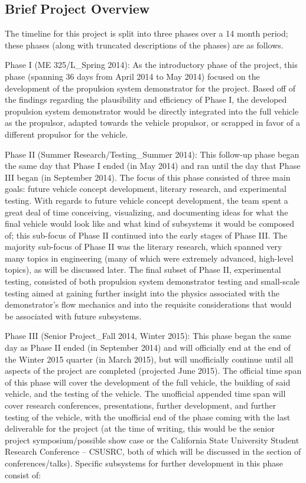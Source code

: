 \documentclass{report}
\begin{document}
\subsection{Brief Project Overview}
The timeline for this project is split into three phases over a 14 month period; these phases (along with truncated descriptions of the phases) are as follows.\par
Phase I (ME 325/L\_Spring 2014): As the introductory phase of the project, this phase (spanning 36 days from April 2014 to May 2014) focused on the development of the propulsion system demonstrator for the project.  Based off of the findings regarding the plausibility and efficiency of Phase I, the developed propulsion system demonstrator would be directly integrated into the full vehicle as the propulsor, adapted towards the vehicle propulsor, or scrapped in favor of a different propulsor for the vehicle.\par
Phase II (Summer Research/Testing\_Summer 2014): This follow-up phase began the same day that Phase I ended (in May 2014) and ran until the day that Phase III began (in September 2014).  The focus of this phase consisted of three main goals: future vehicle concept development, literary research, and experimental testing.  With regards to future vehicle concept development, the team spent a great deal of time conceiving, visualizing, and documenting ideas for what the final vehicle would look like and what kind of subsystems it would be composed of; this sub-focus of Phase II continued into the early stages of Phase III.  The majority sub-focus of Phase II was the literary research, which spanned very many topics in engineering (many of which were extremely advanced, high-level topics), as will be discussed later.  The final subset of Phase II, experimental testing, consisted of both propulsion system demonstrator testing and small-scale testing aimed at gaining further insight into the physics associated with the demonstrator’s flow mechanics and into the requisite considerations that would be associated with future subsystems.\par
Phase III (Senior Project\_Fall 2014, Winter 2015): This phase began the same day as Phase II ended (in September 2014) and will officially end at the end of the Winter 2015 quarter (in March 2015), but will unofficially continue until all aspects of the project are completed (projected June 2015).  The official time span of this phase will cover the development of the full vehicle, the building of said vehicle, and the testing of the vehicle.  The unofficial appended time span will cover research conferences, presentations, further development, and further testing of the vehicle, with the unofficial end of the phase coming with the last deliverable for the project (at the time of writing, this would be the senior project symposium/possible show case or the California State University Student Research Conference – CSUSRC, both of which will be discussed in the section of conferences/talks).  Specific subsystems for further development in this phase consist of:
\end{document}

